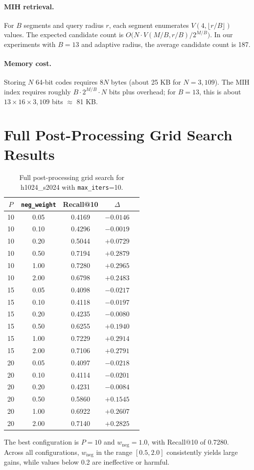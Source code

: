 \documentclass[11pt,a4paper]{article}
\begin{document}
\paragraph{MIH retrieval.} For $B$ segments and query radius $r$, each segment enumerates $V(4, \lfloor r/B \rfloor)$ values. The expected candidate count is $O\bigl(N \cdot V(M/B, r/B) / 2^{M/B}\bigr)$. In our experiments with $B=13$ and adaptive radius, the average candidate count is 187.

\paragraph{Memory cost.} Storing $N$ 64-bit codes requires $8N$ bytes (about 25 KB for $N=3{,}109$). The MIH index requires roughly $B \cdot 2^{M/B} \cdot N$ bits plus overhead; for $B=13$, this is about $13 \times 16 \times 3{,}109$ bits $\approx$ 81 KB.

\section{Full Post-Processing Grid Search Results}

\begin{table}[htbp]
\centering
\caption{Full post-processing grid search for h1024\_s2024 with \texttt{max\_iters}=10.}
\label{tab:full-grid}
\begin{tabular}{ccccc}
\toprule
$P$ & \texttt{neg\_weight} & \textbf{Recall@10} & $\Delta$ \\
\midrule
10 & 0.05 & 0.4169 & $-0.0146$ \\
10 & 0.10 & 0.4296 & $-0.0019$ \\
10 & 0.20 & 0.5044 & $+0.0729$ \\
10 & 0.50 & 0.7194 & $+0.2879$ \\
10 & 1.00 & 0.7280 & $+0.2965$ \\
10 & 2.00 & 0.6798 & $+0.2483$ \\
15 & 0.05 & 0.4098 & $-0.0217$ \\
15 & 0.10 & 0.4118 & $-0.0197$ \\
15 & 0.20 & 0.4235 & $-0.0080$ \\
15 & 0.50 & 0.6255 & $+0.1940$ \\
15 & 1.00 & 0.7229 & $+0.2914$ \\
15 & 2.00 & 0.7106 & $+0.2791$ \\
20 & 0.05 & 0.4097 & $-0.0218$ \\
20 & 0.10 & 0.4114 & $-0.0201$ \\
20 & 0.20 & 0.4231 & $-0.0084$ \\
20 & 0.50 & 0.5860 & $+0.1545$ \\
20 & 1.00 & 0.6922 & $+0.2607$ \\
20 & 2.00 & 0.7140 & $+0.2825$ \\
\bottomrule
\end{tabular}
\end{table}

The best configuration is $P=10$ and $w_{\text{neg}}=1.0$, with Recall@10 of 0.7280. Across all configurations, $w_{\text{neg}}$ in the range $[0.5, 2.0]$ consistently yields large gains, while values below 0.2 are ineffective or harmful.
\end{document}
